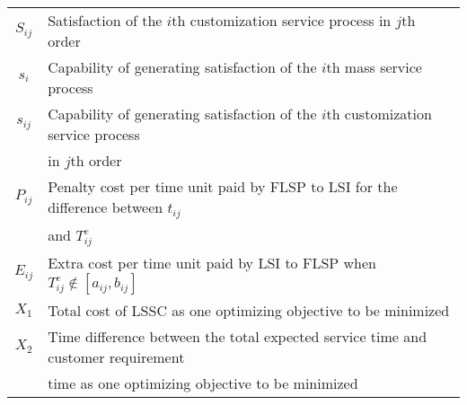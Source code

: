 \documentclass{llncs}
\begin{document}
\begin{center}
\begin{tabular}{c|l}
$S_{ij}$\hspace{1cm} & \hspace{1cm}Satisfaction of the $i$th customization service process in $j$th order \hspace{4cm}\\
$s_i$\hspace{1cm} & \hspace{1cm}Capability of generating satisfaction of the $i$th mass service process  \hspace{4cm}\\
$s_{ij}$\hspace{1cm} & \hspace{1cm}Capability of generating satisfaction of the $i$th customization service process  \hspace{4cm}\\
\hspace{1cm} & \hspace{1cm}in $j$th order \hspace{4cm}\\
$P_{ij}$\hspace{1cm} & \hspace{1cm}Penalty cost per time unit paid by FLSP to LSI for the difference between $t_{ij}$  \hspace{4cm}\\
\hspace{1cm} & \hspace{1cm}and $T_{ij}^e$ \hspace{4cm}\\
$E_{ij}$\hspace{1cm} & \hspace{1cm}Extra cost per time unit paid by  LSI to FLSP when $T_{ij}^e\notin [a_{ij},b_{ij}]$ \hspace{4cm}\\
$X_1$\hspace{1cm} & \hspace{1cm}Total cost of LSSC as one optimizing objective to be minimized \hspace{4cm}\\
$X_2$\hspace{1cm} & \hspace{1cm}Time difference between the total expected service time and customer requirement  \hspace{4cm}\\
\hspace{1cm} & \hspace{1cm}time as one optimizing objective to be minimized\hspace{4cm}\\

\end{tabular}
\end{center}
\end{document}
